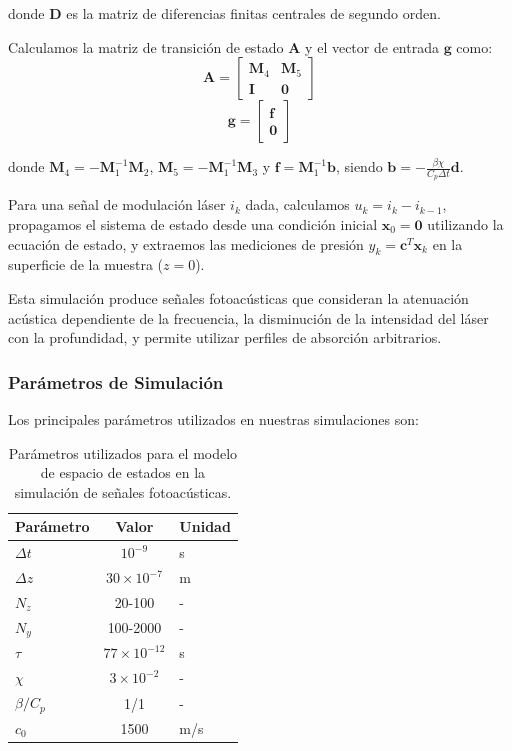 donde $\mathbf{D}$ es la matriz de diferencias finitas centrales de segundo orden.

Calculamos la matriz de transición de estado $\mathbf{A}$ y el vector de entrada $\mathbf{g}$ como:
\begin{equation}
    \mathbf{A} = \begin{bmatrix} \mathbf{M}_4 & \mathbf{M}_5 \\ \mathbf{I} & \mathbf{0} \end{bmatrix}
\end{equation}
\begin{equation}
    \mathbf{g} = \begin{bmatrix} \mathbf{f} \\ \mathbf{0} \end{bmatrix}
\end{equation}

donde $\mathbf{M}_4 = -\mathbf{M}_1^{-1}\mathbf{M}_2$, $\mathbf{M}_5 = -\mathbf{M}_1^{-1}\mathbf{M}_3$ y $\mathbf{f} = \mathbf{M}_1^{-1}\mathbf{b}$, siendo $\mathbf{b} = -\frac{\beta\chi}{C_p\Delta t}\mathbf{d}$.

Para una señal de modulación láser $i_k$ dada, calculamos $u_k = i_k - i_{k-1}$, propagamos el sistema de estado desde una condición inicial $\mathbf{x}_0 = \mathbf{0}$ utilizando la ecuación de estado, y extraemos las mediciones de presión $y_k = \mathbf{c}^T\mathbf{x}_k$ en la superficie de la muestra ($z=0$).

Esta simulación produce señales fotoacústicas que consideran la atenuación acústica dependiente de la frecuencia, la disminución de la intensidad del láser con la profundidad, y permite utilizar perfiles de absorción arbitrarios.

\subsubsection{Parámetros de Simulación}

Los principales parámetros utilizados en nuestras simulaciones son:

\begin{table}[h]
\centering
\begin{tabular}{|l|c|l|}
\hline
\textbf{Parámetro} & \textbf{Valor} & \textbf{Unidad} \\
\hline
$\Delta t$ & $10^{-9}$ & s \\
$\Delta z$ & $30 \times 10^{-7}$ & m \\
$N_z$ & 20-100 & - \\
$N_y$ & 100-2000 & - \\
$\tau$ & $77 \times 10^{-12}$ & s \\
$\chi$ & $3 \times 10^{-2}$ & - \\
$\beta/C_p$ & 1/1 & - \\
$c_0$ & 1500 & m/s \\
\hline
\end{tabular}
\caption{Parámetros utilizados para el modelo de espacio de estados en la simulación de señales fotoacústicas.}
\label{tab:parametros_simulacion}
\end{table}

